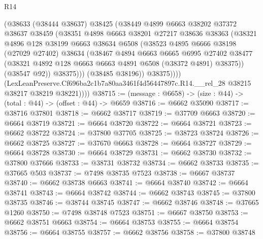 \begin{lexlean}{R14}
\begin{coremodule}
                  (@38633
                    (@38444 @38637)
                    @38425
                    (@38449
                      @4899
                      @6663
                      @38202
                      @37372
                      @38637
                      @38459
                      (@38351
                        @4898
                        @6663
                        @38201
                        @27217
                        @38636
                        @38363
                        (@38321
                          @4896
                          @128
                          @38199
                          @6663
                          @38634
                          @6508
                          (@38523
                            @4895
                            @6666
                            @38198
                            (@27029 @27402)
                            @38634
                            (@38467
                              @4894
                              @6663
                              @6665
                              @6995
                              @27402
                              @38477
                              (@38321 @4892 @128 @6663 @6663 @4891 @6508 (@38372 @4891) @38375))
                            (@38547 @92))
                          @38375)))
                    (@38485 @38196))
                  @38375))))
          (LexLeanPreserve.Cf696ba2c1b7a80aa3461f4d56447897c.R14.__rel_28
            @38215
            @38217
            @38219
            @38221))))
@38715 := (message : @6658) -> (size : @44) -> (total : @44) -> (offset : @44) -> @6659
@38716 := @6662 @35090
@38717 := @38716 @37801
@38718 := @6662 @38717
@38719 := @37709 @6663
@38720 := @6664 @38719
@38721 := @6664 @38720
@38722 := @6664 @38721
@38723 := @6662 @38722
@38724 := @37800 @37705
@38725 := @38723 @38724
@38726 := @6662 @38725
@38727 := @37670 @6663
@38728 := @6664 @38727
@38729 := @6664 @38728
@38730 := @6664 @38729
@38731 := @6662 @38730
@38732 := @37800 @37666
@38733 := @38731 @38732
@38734 := @6662 @38733
@38735 := @37665 @503
@38737 := @7498 @38735 @7523
@38738 := @6667 @38737
@38740 := @6662 @38738 @6663
@38741 := @6664 @38740
@38742 := @6664 @38741
@38743 := @6664 @38742
@38744 := @6662 @38743
@38745 := @37800 @38735
@38746 := @38744 @38745
@38747 := @6662 @38746
@38748 := @37665 @1260
@38750 := @7498 @38748 @7523
@38751 := @6667 @38750
@38753 := @6662 @38751 @6663
@38754 := @6664 @38753
@38755 := @6664 @38754
@38756 := @6664 @38755
@38757 := @6662 @38756
@38758 := @37800 @38748

\end{coremodule}
\end{lexlean}
